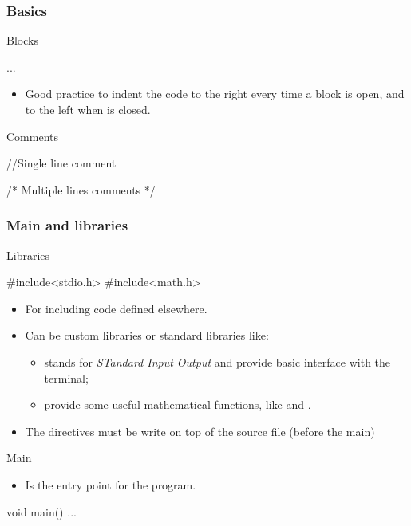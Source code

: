 \begin{frame}[fragile]
  \frametitle{Basics}
  \begin{block}{Blocks}
    \begin{cblock}
{
  ...
}
    \end{cblock}
    \begin{itemize}
    \item Good practice to \alert{indent} the code to the right every
      time a block is open, and to the left when is closed.
    \end{itemize}
  \end{block}
  \begin{block}{Comments}
    \begin{cblock}
//Single line comment

/* Multiple
lines
comments */
    \end{cblock}
  \end{block}
\end{frame}

\begin{frame}[fragile]
  \frametitle{Main and libraries}
  \begin{block}{Libraries}
    \begin{cblock}
#include<stdio.h>
#include<math.h>      
    \end{cblock}
    \begin{itemize}
    \item For including code defined elsewhere.
    \item Can be custom libraries or standard libraries like:
      \begin{itemize}
      \item {} stands for \emph{STandard Input Output} and
        provide basic interface with the terminal;
      \item {} provide some useful mathematical functions,
        like  and .
      \end{itemize}
    \item The  directives must be write on top of the
      source file (before the main)
    \end{itemize}
  \end{block}
\end{frame}

\begin{frame}[fragile]
  \begin{block}{Main}
    \begin{itemize}
    \item Is the entry point for the program.
    \end{itemize}
    \begin{cblock}
void main() {
  ...
}
    \end{cblock}
  \end{block}
\end{frame}

